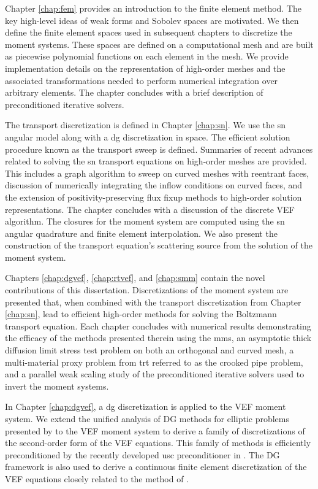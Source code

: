 \documentclass[../doc.tex]{subfiles}
\begin{document}
Chapter \ref{chap:fem} provides an introduction to the finite element method. The key high-level ideas of weak forms and Sobolev spaces are motivated. We then define the finite element spaces used in subsequent chapters to discretize the moment systems. These spaces are defined on a computational mesh and are built as piecewise polynomial functions on each element in the mesh. We provide implementation details on the representation of high-order meshes and the associated transformations needed to perform numerical integration over arbitrary elements. The chapter concludes with a brief description of preconditioned iterative solvers. 

The transport discretization is defined in Chapter \ref{chap:sn}. We use the \gls{sn} angular model along with a \gls{dg} discretization in space. The efficient solution procedure known as the transport sweep is defined. Summaries of recent advances related to solving the \gls{sn} transport equations on high-order meshes are provided. This includes a graph algorithm to sweep on curved meshes with reentrant faces, discussion of numerically integrating the inflow conditions on curved faces, and the extension of positivity-preserving flux fixup methods to high-order solution representations. The chapter concludes with a discussion of the discrete VEF algorithm. The closures for the moment system are computed using the \gls{sn} angular quadrature and finite element interpolation. We also present the construction of the transport equation's scattering source from the solution of the moment system. 

Chapters \ref{chap:dgvef}, \ref{chap:rtvef}, and \ref{chap:smm} contain the novel contributions of this dissertation. Discretizations of the moment system are presented that, when combined with the transport discretization from Chapter \ref{chap:sn}, lead to efficient high-order methods for solving the Boltzmann transport equation. Each chapter concludes with numerical results demonstrating the efficacy of the methods presented therein using the \gls{mms}, an asymptotic thick diffusion limit stress test problem on both an orthogonal and curved mesh, a multi-material proxy problem from \gls{trt} referred to as the crooked pipe problem, and a parallel weak scaling study of the preconditioned iterative solvers used to invert the moment systems. 

In Chapter \ref{chap:dgvef}, a \gls{dg} discretization is applied to the VEF moment system. We extend the unified analysis of DG methods for elliptic problems presented by \textcite{Arnold2002} to the VEF moment system to derive a family of discretizations of the second-order form of the VEF equations. This family of methods is efficiently preconditioned by the recently developed \gls{usc} preconditioner in \textcite{Pazner2021}. The DG framework is also used to derive a continuous finite element discretization of the VEF equations closely related to the method of \textcite{two-level-independent-warsa}. 
\end{document}
